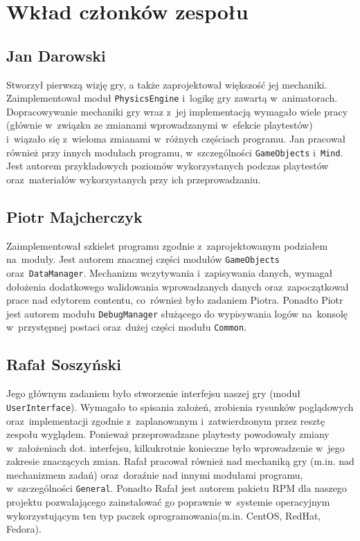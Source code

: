 \documentclass[licencjacka]{pracamgr}
\begin{document}
\chapter{Wkład członków zespołu}

  \section{Jan Darowski}
    Stworzył pierwszą wizję gry, a także zaprojektował większość jej mechaniki. Zaimplementował moduł \texttt{PhysicsEngine}
    i~logikę gry zawartą w~animatorach. Dopracowywanie mechaniki gry wraz z~jej implementacją wymagało wiele pracy (głównie w~związku
    ze zmianami wprowadzanymi w~efekcie playtestów) i~wiązało się z~wieloma zmianami w~różnych częściach programu. 
    Jan pracował również przy innych modułach programu, w~szczególności \texttt{GameObjects} i~\texttt{Mind}. 
    Jest autorem przykładowych poziomów wykorzystanych podczas playtestów oraz~materiałów wykorzystanych przy ich przeprowadzaniu.

  \section{Piotr Majcherczyk}
    Zaimplementował szkielet programu zgodnie z~zaprojektowanym podziałem na~moduły. Jest autorem znacznej części modułów \texttt{GameObjects}
    oraz~\texttt{DataManager}. Mechanizm wczytywania i~zapisywania danych, wymagał dołożenia dodatkowego walidowania wprowadzanych danych
    oraz~zapoczątkował prace nad edytorem contentu, co~również było zadaniem Piotra. Ponadto Piotr jest autorem modułu \texttt{DebugManager}
    służącego do wypisywania logów na~konsolę w~przystępnej postaci oraz~dużej części modułu \texttt{Common}.

  \section{Rafał Soszyński}
    Jego głównym zadaniem było stworzenie interfejsu naszej gry (moduł \texttt{UserInterface}). Wymagało to spisania założeń, zrobienia 
    rysunków poglądowych oraz~implementacji zgodnie z~zaplanowanym i~zatwierdzonym przez resztę zespołu wyglądem. Ponieważ przeprowadzane
    playtesty powodowały zmiany w~założeniach dot. interfejsu, kilkukrotnie konieczne było wprowadzenie w~jego zakresie znaczących zmian.
    Rafał pracował również nad mechaniką gry (m.in. nad mechanizmem zadań) oraz~doraźnie nad innymi modułami programu, w~szczególności
    \texttt{General}. Ponadto Rafał jest autorem pakietu RPM dla naszego projektu pozwalającego zainstalować go poprawnie w~systemie operacyjnym
    wykorzystującym ten typ paczek oprogramowania(m.in. CentOS, RedHat, Fedora).
\end{document}
